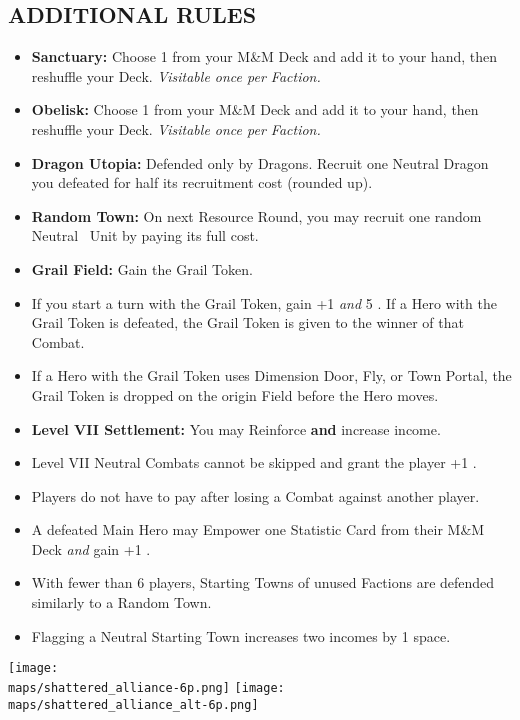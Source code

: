 \begin{multicols*}{2}
\subsection*{\MakeUppercase{Additional Rules}}
\begin{itemize}
  \item \textbf{Sanctuary:} Choose 1  from your M\&M Deck and add it to your hand, then reshuffle your Deck. \textit{Visitable once per Faction.}
  \item \textbf{Obelisk:} Choose 1  from your M\&M Deck and add it to your hand, then reshuffle your Deck. \textit{Visitable once per Faction.}
  \item \textbf{Dragon Utopia:} Defended only by Dragons. Recruit one Neutral Dragon you defeated for half its recruitment cost (rounded up).
  \item \textbf{Random Town:} On next Resource Round, you may recruit one random Neutral \silver\ Unit by paying its full  cost.
  \item \textbf{Grail Field:} Gain the Grail Token.
  \item If you start a turn with the Grail Token, gain +1  \textit{and} 5 . If a Hero with the Grail Token is defeated, the Grail Token is given to the winner of that Combat.
  \item If a Hero with the Grail Token uses Dimension Door, Fly, or Town Portal, the Grail Token is dropped on the origin Field before the Hero moves.
  \item \textbf{Level VII Settlement:} You may Reinforce \textbf{and} increase income.
  \item Level VII Neutral Combats cannot be skipped and grant the player +1 .
\item Players do not have to pay  after losing a Combat against another player.
  \item A defeated Main Hero may Empower one Statistic Card from their M\&M Deck \textit{and} gain +1 .
  \item With fewer than 6 players, Starting Towns of unused Factions are defended similarly to a Random Town.
  \item Flagging a Neutral Starting Town increases two incomes by 1 space.
\end{itemize}

\begin{center}
  \vspace*{\fill}
  \texttt{[image: \\maps/shattered\_alliance-6p.png]}
  \vspace*{\fill}
  \texttt{[image: \\maps/shattered\_alliance\_alt-6p.png]}
  \vspace*{\fill}
\end{center}

\end{multicols*}
